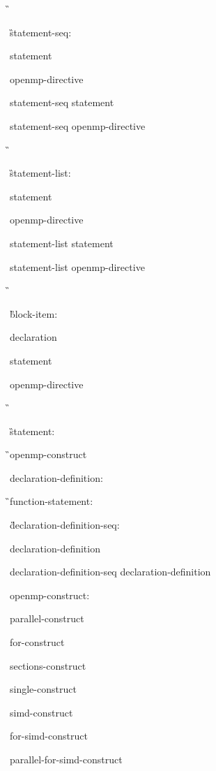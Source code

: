 { %
\I\G\cppspecificstart

\G statement-seq:

\I statement

\I openmp-directive

\I statement-seq statement

\I statement-seq openmp-directive

\G\cppspecificend

\cNinetyspecificstart

\G statement-list:

\I statement

\I openmp-directive

\I statement-list statement

\I statement-list openmp-directive

\G\cNinetyspecificend

\cNinetyNinespecificstart

\G block-item:

\I declaration

\I statement

\I openmp-directive

\G\cNinetyNinespecificend

\G statement:

\C{}

\G\I openmp-construct

\I declaration-definition:

\C{}

\G\I function-statement:

\C{}

\G declaration-definition-seq:

\I declaration-definition

\I declaration-definition-seq declaration-definition

openmp-construct:

\I parallel-construct

\I for-construct

\I sections-construct

\I single-construct

\I simd-construct

\I for-simd-construct

\I parallel-for-simd-construct

}
